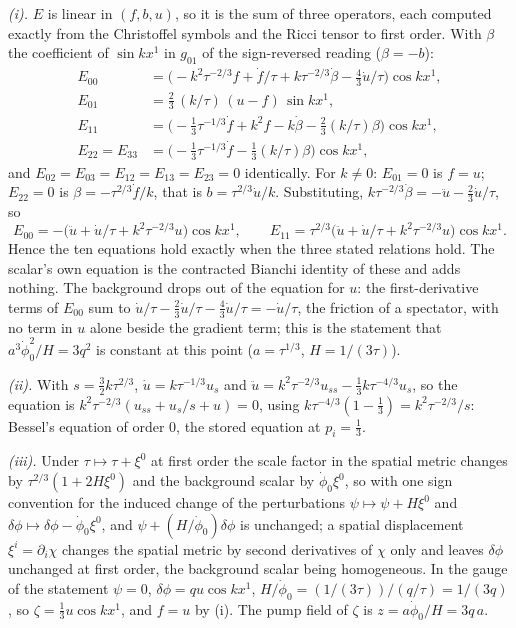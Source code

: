 \emph{(i).} $E$ is linear in $(f, b, u)$, so it is the sum of three operators, each computed exactly from the Christoffel symbols and the Ricci tensor to first order. With $\beta$ the coefficient of $\sin kx^{1}$ in $g_{01}$ of the sign-reversed reading ($\beta = -b$):
\begin{align*}
E_{00} &= \bigl(-k^{2}\tau^{-2/3}f + \dot f/\tau + k\tau^{-2/3}\dot\beta - \tfrac43\dot u/\tau\bigr)\cos kx^{1},\\
E_{01} &= \tfrac23\,(k/\tau)\,(u - f)\,\sin kx^{1},\\
E_{11} &= \bigl(-\tfrac13\tau^{-1/3}\dot f + k^{2}f - k\dot\beta - \tfrac23(k/\tau)\beta\bigr)\cos kx^{1},\\
E_{22} = E_{33} &= \bigl(-\tfrac13\tau^{-1/3}\dot f - \tfrac13(k/\tau)\beta\bigr)\cos kx^{1},
\end{align*}
and $E_{02} = E_{03} = E_{12} = E_{13} = E_{23} = 0$ identically. For $k \neq 0$: $E_{01} = 0$ is $f = u$; $E_{22} = 0$ is $\beta = -\tau^{2/3}\dot f/k$, that is $b = \tau^{2/3}\dot u/k$. Substituting, $k\tau^{-2/3}\dot\beta = -\ddot u - \tfrac23\dot u/\tau$, so
\[
E_{00} = -\bigl(\ddot u + \dot u/\tau + k^{2}\tau^{-2/3}u\bigr)\cos kx^{1}, \qquad E_{11} = \tau^{2/3}\bigl(\ddot u + \dot u/\tau + k^{2}\tau^{-2/3}u\bigr)\cos kx^{1} .
\]
Hence the ten equations hold exactly when the three stated relations hold. The scalar's own equation is the contracted Bianchi identity of these and adds nothing. The background drops out of the equation for $u$: the first-derivative terms of $E_{00}$ sum to $\dot u/\tau - \tfrac23\dot u/\tau - \tfrac43\dot u/\tau = -\dot u/\tau$, the friction of a spectator, with no term in $u$ alone beside the gradient term; this is the statement that $a^{3}\dot\phi_{0}^{2}/H = 3q^{2}$ is constant at this point ($a = \tau^{1/3}$, $H = 1/(3\tau)$).

\emph{(ii).} With $s = \tfrac32k\tau^{2/3}$, $\dot u = k\tau^{-1/3}u_{s}$ and $\ddot u = k^{2}\tau^{-2/3}u_{ss} - \tfrac13k\tau^{-4/3}u_{s}$, so the equation is $k^{2}\tau^{-2/3}(u_{ss} + u_{s}/s + u) = 0$, using $k\tau^{-4/3}(1 - \tfrac13) = k^{2}\tau^{-2/3}/s$: Bessel's equation of order $0$, the stored equation at $p_{i} = \tfrac13$.

\emph{(iii).} Under $\tau \mapsto \tau + \xi^{0}$ at first order the scale factor in the spatial metric changes by $\tau^{2/3}(1 + 2H\xi^{0})$ and the background scalar by $\dot\phi_{0}\xi^{0}$, so with one sign convention for the induced change of the perturbations $\psi \mapsto \psi + H\xi^{0}$ and $\delta\phi \mapsto \delta\phi - \dot\phi_{0}\xi^{0}$, and $\psi + (H/\dot\phi_{0})\delta\phi$ is unchanged; a spatial displacement $\xi^{i} = \partial_{i}\chi$ changes the spatial metric by second derivatives of $\chi$ only and leaves $\delta\phi$ unchanged at first order, the background scalar being homogeneous. In the gauge of the statement $\psi = 0$, $\delta\phi = qu\cos kx^{1}$, $H/\dot\phi_{0} = (1/(3\tau))/(q/\tau) = 1/(3q)$, so $\zeta = \tfrac13u\cos kx^{1}$, and $f = u$ by (i). The pump field of $\zeta$ is $z = a\dot\phi_{0}/H = 3q\,a$.

